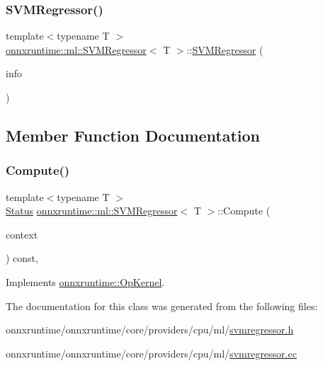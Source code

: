 \subsubsection{\texorpdfstring{S\+V\+M\+Regressor()}{SVMRegressor()}}
{\footnotesize\ttfamily template$<$typename T $>$ \\
\mbox{\hyperlink{classonnxruntime_1_1ml_1_1SVMRegressor}{onnxruntime\+::ml\+::\+S\+V\+M\+Regressor}}$<$ T $>$\+::\mbox{\hyperlink{classonnxruntime_1_1ml_1_1SVMRegressor}{S\+V\+M\+Regressor}} (\begin{DoxyParamCaption}\item[{const \mbox{\hyperlink{classonnxruntime_1_1OpKernelInfo}{Op\+Kernel\+Info}} \&}]{info }\end{DoxyParamCaption})}



\subsection{Member Function Documentation}
\mbox{\label{classonnxruntime_1_1ml_1_1SVMRegressor_a3620c635cd0b067dd69eafdeb4b0fda1}} 
\subsubsection{\texorpdfstring{Compute()}{Compute()}}
{\footnotesize\ttfamily template$<$typename T $>$ \\
\mbox{\hyperlink{classonnxruntime_1_1common_1_1Status}{Status}} \mbox{\hyperlink{classonnxruntime_1_1ml_1_1SVMRegressor}{onnxruntime\+::ml\+::\+S\+V\+M\+Regressor}}$<$ T $>$\+::Compute (\begin{DoxyParamCaption}\item[{\mbox{\hyperlink{classonnxruntime_1_1OpKernelContext}{Op\+Kernel\+Context}} $\ast$}]{context }\end{DoxyParamCaption}) const\hspace{0.3cm}{\ttfamily [override]}, {\ttfamily [virtual]}}



Implements \mbox{\hyperlink{classonnxruntime_1_1OpKernel_a9eca8656a78b1b3ab9d3351a12798650}{onnxruntime\+::\+Op\+Kernel}}.



The documentation for this class was generated from the following files\+:\begin{DoxyCompactItemize}
\item 
onnxruntime/onnxruntime/core/providers/cpu/ml/\mbox{\hyperlink{svmregressor_8h}{svmregressor.\+h}}\item 
onnxruntime/onnxruntime/core/providers/cpu/ml/\mbox{\hyperlink{svmregressor_8cc}{svmregressor.\+cc}}\end{DoxyCompactItemize}
